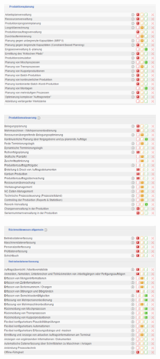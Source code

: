 \documentclass[12pt]{article}
\begin{document}
\begin{figure}[!h]
\centering
\includegraphics[width=0.7\textwidth]{images/tr21}
\end{figure}\FloatBarrier
\noindent
\begin{figure}[!h]
\centering
\includegraphics[width=0.7\textwidth]{images/tr22}
\end{figure}\FloatBarrier
\noindent
\begin{figure}[!h]
\centering
\includegraphics[width=0.7\textwidth]{images/tr23}
\end{figure}\FloatBarrier
\noindent
\end{document}
